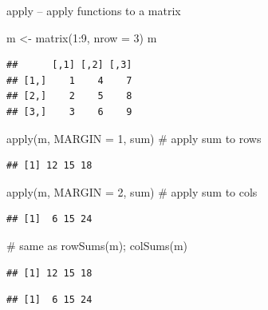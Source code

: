 \documentclass[
  9pt,
  ignorenonframetext,
]{beamer}
\newenvironment{Shaded}{\begin{snugshade}}{\end{snugshade}}
\newcommand{\CommentTok}[1]{\textcolor[rgb]{0.50,0.62,0.50}{#1}}
\newcommand{\DataTypeTok}[1]{\textcolor[rgb]{0.87,0.87,0.75}{#1}}
\newcommand{\DecValTok}[1]{\textcolor[rgb]{0.86,0.86,0.80}{#1}}
\newcommand{\KeywordTok}[1]{\textcolor[rgb]{0.94,0.87,0.69}{#1}}
\newcommand{\NormalTok}[1]{\textcolor[rgb]{0.80,0.80,0.80}{#1}}
\newcommand{\OperatorTok}[1]{\textcolor[rgb]{0.94,0.94,0.82}{#1}}
\newcommand{\StringTok}[1]{\textcolor[rgb]{0.80,0.58,0.58}{#1}}
\begin{document}
\begin{frame}[fragile]{apply -- apply functions to a matrix}
\protect\hypertarget{apply-apply-functions-to-a-matrix}{}
\begin{Shaded}
\begin{Highlighting}[]
\NormalTok{m \textless{}{-}}\StringTok{ }\KeywordTok{matrix}\NormalTok{(}\DecValTok{1}\OperatorTok{:}\DecValTok{9}\NormalTok{, }\DataTypeTok{nrow =} \DecValTok{3}\NormalTok{)}
\NormalTok{m}
\end{Highlighting}
\end{Shaded}

\begin{verbatim}
##      [,1] [,2] [,3]
## [1,]    1    4    7
## [2,]    2    5    8
## [3,]    3    6    9
\end{verbatim}

\begin{Shaded}
\begin{Highlighting}[]
\KeywordTok{apply}\NormalTok{(m, }\DataTypeTok{MARGIN =} \DecValTok{1}\NormalTok{, sum)       }\CommentTok{\# apply sum to rows}
\end{Highlighting}
\end{Shaded}

\begin{verbatim}
## [1] 12 15 18
\end{verbatim}

\begin{Shaded}
\begin{Highlighting}[]
\KeywordTok{apply}\NormalTok{(m, }\DataTypeTok{MARGIN =} \DecValTok{2}\NormalTok{, sum)       }\CommentTok{\# apply sum to cols}
\end{Highlighting}
\end{Shaded}

\begin{verbatim}
## [1]  6 15 24
\end{verbatim}

\begin{Shaded}
\begin{Highlighting}[]
\CommentTok{\# same as}
\KeywordTok{rowSums}\NormalTok{(m); }\KeywordTok{colSums}\NormalTok{(m)}
\end{Highlighting}
\end{Shaded}

\begin{verbatim}
## [1] 12 15 18
\end{verbatim}

\begin{verbatim}
## [1]  6 15 24
\end{verbatim}
\end{frame}
\end{document}
